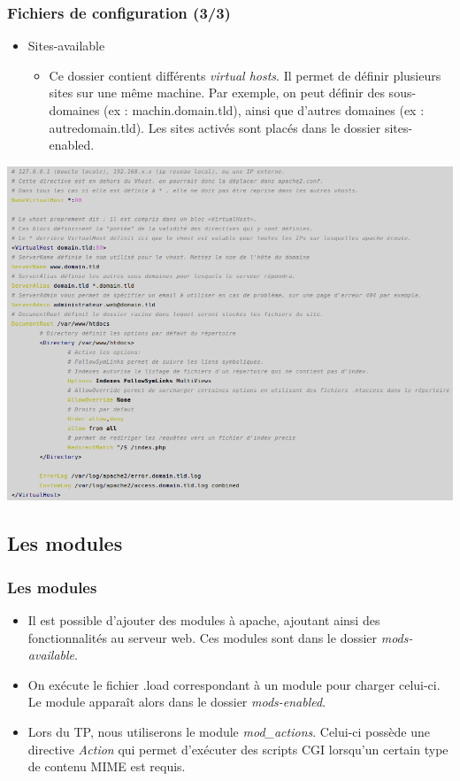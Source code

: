\begin{frame}
	\frametitle{Fichiers de configuration (3/3)}
	\begin{itemize}
	      \item Sites-available
	      \begin{itemize}
		  \item Ce dossier contient différents \textit{virtual hosts}. Il permet de définir plusieurs sites sur une même machine. Par exemple, on peut définir des sous-domaines (ex : machin.domain.tld), ainsi que d'autres domaines (ex : autredomain.tld). Les sites activés sont placés dans le dossier sites-enabled.
	      \end{itemize}
	\end{itemize}
	\begin{center}
		\includegraphics[scale=0.4]{Images/sites-available.png}
	\end{center}
\end{frame}

\subsection{Les modules}

\begin{frame}
	\frametitle{Les modules}
	\begin{itemize}
	  \item Il est possible d'ajouter des modules à apache, ajoutant ainsi des fonctionnalités au serveur web. Ces modules sont dans le dossier \textit{mods-available}.
	  \item On exécute le fichier .load correspondant à un module pour charger celui-ci. Le module apparaît alors dans le dossier \textit{mods-enabled}.
	  \item Lors du TP, nous utiliserons le module \textit{mod\_actions}. Celui-ci possède une directive \textit{Action} qui permet d'exécuter des scripts CGI lorsqu'un certain type de contenu MIME est requis.
	\end{itemize}
\end{frame}

